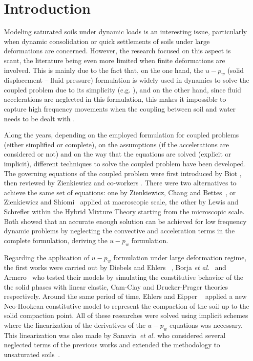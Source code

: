 \documentclass[twocolumn]{svjour3}          %
\begin{document}
\section{Introduction}
\label{intro}
{\color{red}
Modeling saturated soils under dynamic loads is an interesting issue, particularly when dynamic consolidation or quick settlements of soils under large deformations are concerned. However, the research focused on this aspect is scant,  the literature being even more limited when finite deformations are involved. This is mainly due to the fact that, on the one hand, the $u-p_w$ (solid displacement -- fluid pressure) formulation is widely used in dynamics to solve the coupled problem due to its simplicity (e.g. \cite{CaoSanavia:16,zienkiewicz1990a,Zienkiewicz99}), and on the other hand, since fluid accelerations are neglected in this formulation, this makes it impossible to capture high frequency movements when the coupling between soil and water needs to be dealt with \cite{zienkiewicz1980}.

Along the years, depending on the employed formulation for coupled problems (either simplified or complete), on the assumptions (if the accelerations are considered or not) and on the way that the equations are solved (explicit or implicit),  different techniques to solve the coupled problem have been developed.  The governing equations   of the coupled  problem were first introduced by Biot \cite{Biot1956poro}, then reviewed by   Zienkiewicz and co-workers \cite{Zienkiewicz99,zienkiewicz1980,zienkiewicz1984,zienkiewicz1990a}. There were two alternatives  to achieve the same set of equations:  one by  Zienkiewicz, Chang and Bettes~\cite{zienkiewicz1980}, or Zienkiewicz and Shiomi~\cite{zienkiewicz1984,zienkiewicz1990a} applied at macroscopic scale,   the other   by Lewis and Schrefler \cite{LewisSchrefler98} within the Hybrid Mixture Theory starting from the microscopic scale. 
 Both showed that an accurate enough solution can be achieved for low frequency dynamic problems by neglecting the convective and acceleration terms in the complete formulation, deriving the $u-p_w$ formulation.
 
Regarding the application of $u-p_w$ formulation under large deformation regime, the first works were  carried out by Diebels and Ehlers ~\cite{DiebelsE:96}, Borja \textit{et al.}~\cite{borja95,borja98} and Armero~\cite{Armero99} who tested their models by simulating the constitutive behavior of the the solid phases with linear elastic, Cam-Clay and Drucker-Prager theories respectively.  Around the same period of time, Ehlers and Eipper ~\cite{Ehlers:99} applied a new Neo-Hookean constitutive model to represent the compaction of the soil up to the solid compaction point. All of these researches were solved using implicit schemes where the linearization of the derivatives of the $u-p_w$ equations was necessary. This linearization was also made by Sanavia~\textit{et al.}\cite{Sanavia:01} who considered several neglected terms of the previous works and extended the methodology to unsaturated soils~\cite{Sanavia:02}.

}
\end{document}
